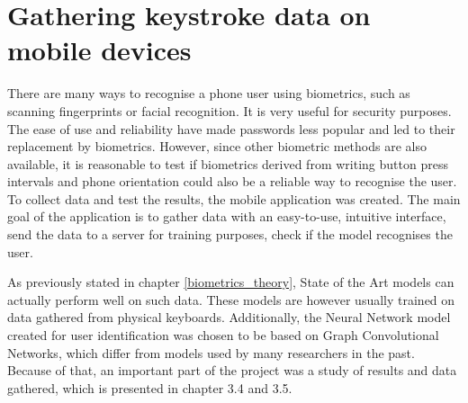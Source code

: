
\chapter{Gathering keystroke data on mobile devices}

There are many ways to recognise a phone user using biometrics, such as scanning fingerprints or facial recognition. It is very useful for security purposes. The ease of use and reliability have made passwords less popular and led to their replacement by biometrics. However, since other biometric methods are also available, it is reasonable to test if biometrics derived from writing button press intervals and phone orientation could also be a reliable way to recognise the user. To collect data and test the results, the mobile application was created.
The main goal of the application is to gather data with an easy-to-use, intuitive interface, send the data to a server for training purposes, check if the model recognises the user. 

As previously stated in chapter \ref{biometrics_theory}, State of the Art models can actually perform well on such data. These models are however usually trained on data gathered from physical keyboards. Additionally, the Neural Network model created for user identification was chosen to be based on Graph Convolutional Networks, which differ from models used by many researchers in the past.
Because of that, an important part of the project was a study of results and data gathered, which is presented in chapter 3.4 and 3.5.


